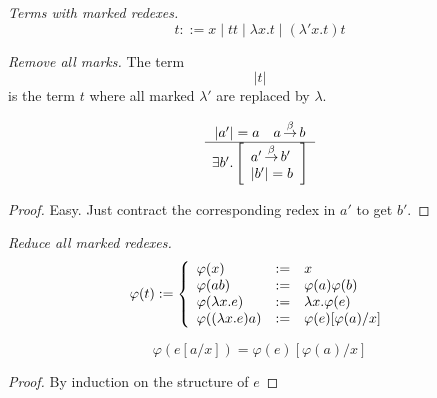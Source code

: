 {

    \begin{definition}
        \emph{Terms with marked redexes.}
        $$
        t ::= x \mid t t \mid \lambda x. t \mid (\lambda' x. t) t
        $$
    \end{definition}



    \begin{definition}
        \emph{Remove all marks.}
        The term
        $$
        |t|
        $$
        is the term $t$ where all marked $\lambda'$ are replaced by $\lambda$.
    \end{definition}




    \begin{lemma}
        \label{thm:ReductionLiftedToMark}
        $$
        \begin{array}{c} 
            |a'| = a
            \quad
            a {\,\stackrel{\beta}{\to}\,} b
         \\ \hline 
            \exists b'. \left[ \begin{array}{l} 
                a' {\,\stackrel{\beta}{\to}\,} b'
                \\
                |b'| = b
             \end{array} \right]
        \end{array}
        $$

        \begin{proof}
            Easy. Just contract the corresponding redex in $a'$ to get $b'$.
        \end{proof}
    \end{lemma}




    \begin{definition}
        \emph{Reduce all marked redexes.}
        $$
        \varphi(t) :=
        \left\{ \begin{array}{llll} 
            \varphi(x) &:=& x
            \\
            \varphi(a b) &:=& \varphi(a) \varphi(b)
            \\
            \varphi(\lambda x .e) &:=& \lambda x. \varphi(e)
            \\
            \varphi ((\lambda x.e) a) &:=& \varphi(e)[\varphi(a)/x]
         \end{array} \right.
        $$
    \end{definition}




    \begin{lemma}
        \label{thm:PhiSubstitution}
        $$
        \varphi(e[a/x]) = \varphi(e)[\varphi(a)/x]
        $$

        \begin{proof}
            By induction on the structure of $e$
        \end{proof}
    \end{lemma}




}

